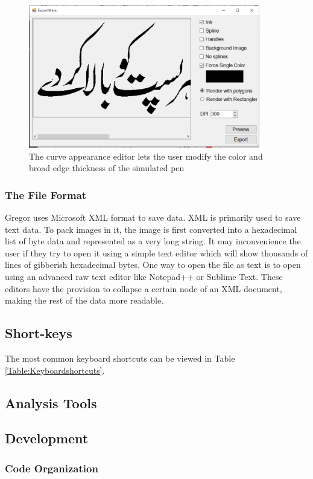 {{        \begin{figure}
          \centering
          \includegraphics[width=0.9\textwidth]{ExportMenu.PNG}
          \caption{The curve appearance editor lets the user modify the color and broad edge thickness of the simulated pen} \label{Fig:ExportMenu}
        \end{figure}
    }
    \subsubsection{The File Format}
    {
        Gregor uses Microsoft XML format to save data. XML is primarily used to save text data. To pack images in it, the image is first converted into a hexadecimal list of byte data and represented as a very long string. It may inconvenience the user if they try to open it using a simple text editor which will show thousands of lines of gibberish hexadecimal bytes. One way to open the file as text is to open using an advanced raw text editor like Notepad++ or Sublime Text. These editors have the provision to collapse a certain node of an XML document, making the rest of the data more readable.
    }
}
\subsection{Short-keys}
{
    The most common keyboard shortcuts can be viewed in Table \ref{Table:Keyboardshortcuts}.
}
\subsection{Analysis Tools}
{
}
\subsection{Development}
\subsubsection{Code Organization}
